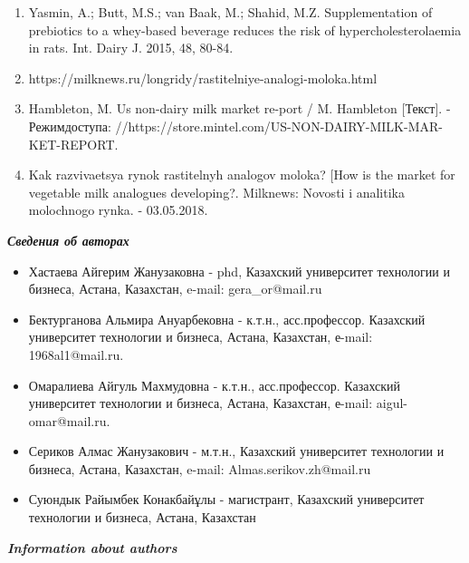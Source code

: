 \begin{enumerate}
\item
Yasmin, A.; Butt, M.S.; van Baak, M.; Shahid, M.Z. Supplementation of
prebiotics to a whey-based beverage reduces the risk of
hypercholesterolaemia in rats. Int. Dairy J. 2015, 48, 80-84.

\item
https://milknews.ru/longridy/rastitelniye-analogi-moloka.html

\item
Hambleton, M. Us non-dairy milk market re-port / M. Hambleton
{[}Текст{]}. - Режимдоступа:
//https://store.mintel.com/US-NON-DAIRY-MILK-MAR-KET-REPORT.

\item
Kak razvivaetsya rynok rastitel\textquotesingle nyh analogov moloka?
{[}How is the market for vegetable milk analogues developing?. Milknews:
Novosti i analitika molochnogo rynka. - 03.05.2018.
\end{enumerate}

\emph{{\bfseries Сведения об авторах}}

\begin{itemize}
\item
Хастаева Айгерим Жанузаковна - phd, Казахский университет технологии и
бизнеса, Астана, Казахстан, e-mail: gera\_or@mail.ru

\item
Бектурганова Альмира Ануарбековна - к.т.н., асс.профессор. Казахский
университет технологии и бизнеса, Астана, Казахстан, е-mail:
1968al1@mail.ru.

\item
Омаралиева Айгуль Махмудовна - к.т.н., асс.профессор. Казахский
университет технологии и бизнеса, Астана, Казахстан, е-mail:
aigul-omar@mail.ru.

\item
Сериков Алмас Жанузакович - м.т.н., Казахский университет технологии и
бизнеса, Астана, Казахстан, e-mail: Almas.serikov.zh@mail.ru

\item
Суюндык Райымбек Конакбайұлы - магистрант, Казахский университет
технологии и бизнеса, Астана, Казахстан
\end{itemize}

\emph{{\bfseries Information about authors}}

